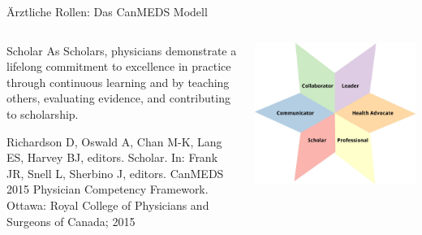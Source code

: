 \documentclass{beamer}
\begin{document}
\begin{frame}{Ärztliche Rollen: Das CanMEDS Modell}


\begin{columns}

\begin{column}{5cm}
\begin{block}{Scholar}
As Scholars, physicians demonstrate a lifelong commitment to excellence in practice through continuous learning and
by teaching others, evaluating evidence, and contributing to scholarship.
\end{block}

\tiny{Richardson D, Oswald A, Chan M-K, Lang ES, Harvey BJ, editors.
Scholar. In: Frank JR, Snell L, Sherbino J, editors. CanMEDS 2015
Physician Competency Framework. Ottawa: Royal College of
Physicians and Surgeons of Canada; 2015}
\end{column}
\begin{column}{5cm}
\begin{center}
    \includegraphics[width=\textwidth]{CanMEDs.jpg}
\end{center}

\end{column}

\end{columns}

\end{frame}

\end{document}
